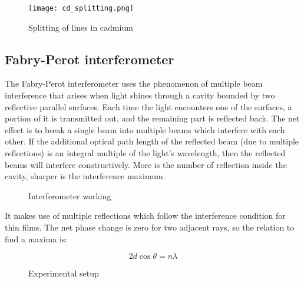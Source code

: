 	\begin{figure}[H]
		\centering
		\texttt{[image: cd\_splitting.png]}
		\caption{Splitting of lines in cadmium}
		\label{fig:splitting}
	\end{figure}

	\subsection{Fabry-Perot interferometer}
		The Fabry-Perot interferometer uses the phenomenon of multiple beam interference that arises when light shines through a cavity bounded by two reflective parallel surfaces. Each time the light encounters one of the surfaces, a portion of it is transmitted out, and the remaining part is reflected back. The net effect is to break a single beam into multiple beams which interfere with each other. If the additional optical path length of the reflected beam (due to multiple reflections) is an integral multiple of the light's wavelength, then the reflected beams will interfere constructively. More is the number of reflection inside the cavity, sharper is the interference maximum. 


		\begin{figure}[H]
			\centering
			\caption{Interferometer working}
			\label{fig:interferometer}
		\end{figure}
		It makes use of multiple reflections which follow the interference condition for thin films. The net phase change is zero for two adjacent rays, so the relation to find a maxima is:

		\begin{equation}
			2d\cos\theta = n\lambda
		\end{equation}

		\begin{figure}[H]
			\centering
			\caption{Experimental setup}
			\label{fig:setup}
		\end{figure}
